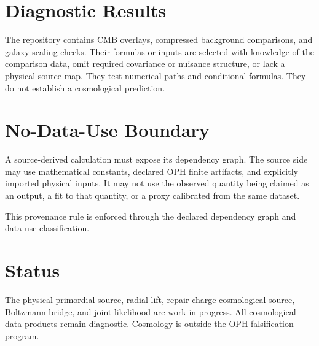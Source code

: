 \documentclass[11pt]{article}
\begin{document}
\section{Diagnostic Results}

The repository contains CMB overlays, compressed background comparisons, and
galaxy scaling checks. Their formulas or inputs are selected with knowledge of
the comparison data, omit required covariance or nuisance structure, or lack a
physical source map. They test numerical paths and conditional formulas. They
do not establish a cosmological prediction.

\section{No-Data-Use Boundary}

A source-derived calculation must expose its dependency graph. The source side
may use mathematical constants, declared OPH finite artifacts, and explicitly
imported physical inputs. It may not use the observed quantity being claimed as
an output, a fit to that quantity, or a proxy calibrated from the same dataset.

This provenance rule is enforced through the declared dependency graph and
data-use classification.

\section{Status}

The physical primordial source, radial lift, repair-charge cosmological source,
Boltzmann bridge, and joint likelihood are work in progress. All cosmological
data products remain diagnostic. Cosmology is outside the OPH falsification
program.
\end{document}
